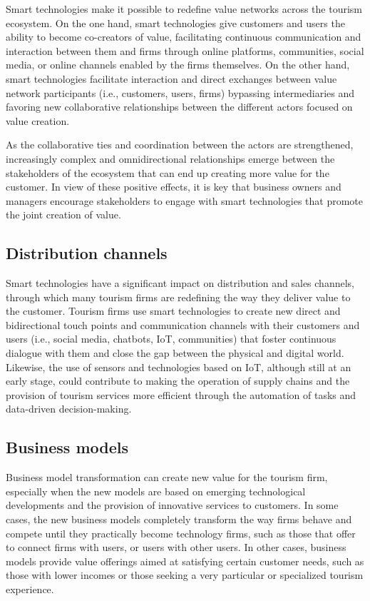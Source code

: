 \documentclass[
  letterpaper,
  DIV=11,
  numbers=noendperiod]{scrreprt}
\begin{document}
Smart technologies make it possible to redefine value networks across
the tourism ecosystem. On the one hand, smart technologies give
customers and users the ability to become co-creators of value,
facilitating continuous communication and interaction between them and
firms through online platforms, communities, social media, or online
channels enabled by the firms themselves. On the other hand, smart
technologies facilitate interaction and direct exchanges between value
network participants (i.e., customers, users, firms) bypassing
intermediaries and favoring new collaborative relationships between the
different actors focused on value creation.

As the collaborative ties and coordination between the actors are
strengthened, increasingly complex and omnidirectional relationships
emerge between the stakeholders of the ecosystem that can end up
creating more value for the customer. In view of these positive effects,
it is key that business owners and managers encourage stakeholders to
engage with smart technologies that promote the joint creation of value.

\hypertarget{distribution-channels}{%
\subsection{Distribution channels}\label{distribution-channels}}

Smart technologies have a significant impact on distribution and sales
channels, through which many tourism firms are redefining the way they
deliver value to the customer. Tourism firms use smart technologies to
create new direct and bidirectional touch points and communication
channels with their customers and users (i.e., social media, chatbots,
IoT, communities) that foster continuous dialogue with them and close
the gap between the physical and digital world. Likewise, the use of
sensors and technologies based on IoT, although still at an early stage,
could contribute to making the operation of supply chains and the
provision of tourism services more efficient through the automation of
tasks and data-driven decision-making.

\hypertarget{business-models-1}{%
\subsection{Business models}\label{business-models-1}}

Business model transformation can create new value for the tourism firm,
especially when the new models are based on emerging technological
developments and the provision of innovative services to customers. In
some cases, the new business models completely transform the way firms
behave and compete until they practically become technology firms, such
as those that offer to connect firms with users, or users with other
users. In other cases, business models provide value offerings aimed at
satisfying certain customer needs, such as those with lower incomes or
those seeking a very particular or specialized tourism experience.
\end{document}
